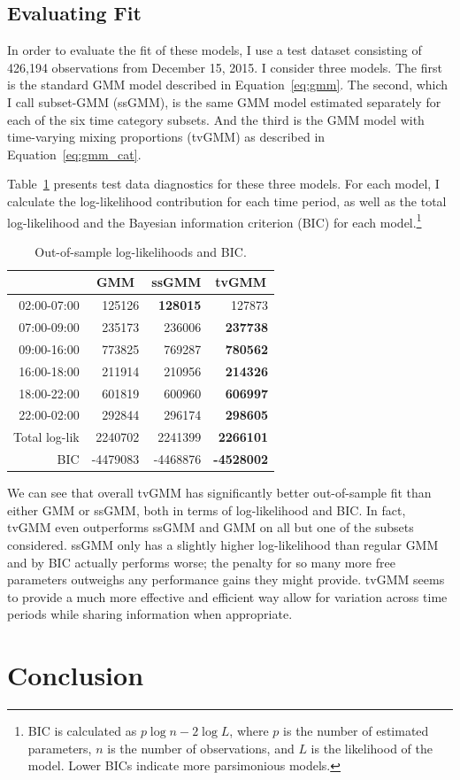 \documentclass[12pt]{article}
\theoremstyle{definition}
\theoremstyle{algodesc}
\begin{document}
\subsection{Evaluating Fit}
In order to evaluate the fit of these models, I use a test dataset consisting of 426,194 observations from December 15, 2015. I consider three models. The first is the standard GMM model described in Equation~\ref{eq:gmm}. The second, which I call subset-GMM (ssGMM), is the same GMM model estimated separately for each of the six time category subsets. And the third is the GMM model with time-varying mixing proportions (tvGMM) as described in Equation~\ref{eq:gmm_cat}.

Table~\ref{tab:logliks} presents test data diagnostics for these three models. For each model, I calculate the log-likelihood contribution for each time period, as well as the total log-likelihood and the Bayesian information criterion (BIC) for each model.\footnote{BIC is calculated as $p \log n - 2 \log L$, where $p$ is the number of estimated parameters, $n$ is the number of observations, and $L$ is the likelihood of the model. Lower BICs indicate more parsimonious models.}

\begin{table}[htb] \centering
\begin{tabular}{rrrr}
  \toprule
   & \multicolumn{1}{c}{GMM} & \multicolumn{1}{c}{ssGMM} & \multicolumn{1}{c}{tvGMM} \\
  \midrule
  02:00-07:00 &  125126 &  \textbf{128015} &  127873 \\
  07:00-09:00 &  235173 &  236006 &  \textbf{237738} \\
  09:00-16:00 &  773825 &  769287 &  \textbf{780562} \\
  16:00-18:00 &  211914 &  210956 &  \textbf{214326} \\
  18:00-22:00 &  601819 &  600960 &  \textbf{606997} \\
  22:00-02:00 &  292844 &  296174 &  \textbf{298605} \\
  \midrule
  Total log-lik &  2240702 &  2241399 &  \textbf{2266101} \\
  BIC           & -4479083 & -4468876 & \textbf{-4528002} \\
  \bottomrule
\end{tabular}
\caption{Out-of-sample log-likelihoods and BIC.}
\label{tab:logliks}
\end{table}

We can see that overall tvGMM has significantly better out-of-sample fit than either GMM or ssGMM, both in terms of log-likelihood and BIC. In fact, tvGMM even outperforms ssGMM and GMM on all but one of the subsets considered. ssGMM only has a slightly higher log-likelihood than regular GMM and by BIC actually performs worse; the penalty for so many more free parameters outweighs any performance gains they might provide. tvGMM seems to provide a much more effective and efficient way allow for variation across time periods while sharing information when appropriate.


\section{Conclusion}




\end{document}
